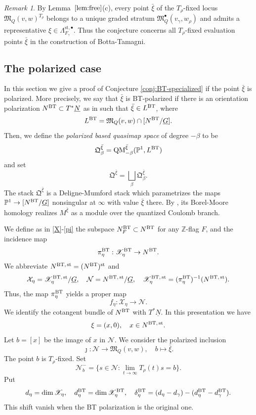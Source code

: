 \documentclass[11pt,reqno]{amsart}
\theoremstyle{definition}
\theoremstyle{remark}
\newtheorem{Remark}[Theorem]{Remark}
\def\dN{\underline N}
\def\dG{\underline G}
\def\dQ{\underline Q}
\def\calN{\mathcal N}
\def\M{\mathfrak M}
\begin{document}
\begin{Remark}
By Lemma~\(\ref{lem:free}\)(c), every point $\bar\xi$
of the \(T_\rho\)-fixed locus \(\M_Q(v,w)^{T_\rho}\) belongs to a unique graded stratum \(\M_{\dQ}^\bullet(v_\gamma,w_\rho)\) and admits a representative
 \(\xi\in\Lambda_{F_\gamma}^{\mathrm{st},\bullet}\). Thus the conjecture concerns all \(T_\rho\)-fixed evaluation points $\bar\xi$ in
 the construction of Botta-Tamagni. 
\end{Remark}



\subsection{The polarized case}
In this section we give a proof of Conjecture \ref{conj:BT-specialized} if the point $\bar\xi$ is polarized.
More precisely, we say that $\bar\xi$ is BT-polarized if there is
an orientation polarization $N^{\rm BT}\subset T^*\dN$ as in \cite[\S1.3.5]{BT26} such that $\bar\xi\in L^{\rm BT}$, where
$$L^{\rm BT}=\M_Q(v,w)\cap[N^{\rm BT}/\dG].$$
Then, we define the \emph{polarized based quasimap space} of degree $-\beta$ to be
\[\mathfrak Q_\beta^{\bar\xi}=\operatorname{QM}_{-\beta}^{\bar\xi}(\mathbb P^1,L^{\rm BT})\]
and set
$$\mathfrak Q^{\bar\xi}=\bigsqcup_\beta\mathfrak Q_\beta^{\bar\xi}.$$
The stack $\mathfrak Q^{\bar\xi}$
 is a Deligne-Mumford stack which parametrizes the maps $\mathbb P^1\to [N^{\rm BT}/\dG]$ nonsingular at $\infty$
with value $\bar\xi$ there.
By \cite[Props.~1.3.8, 2.4.8, 3.2.2]{BT26}, its
Borel-Moore homology realizes $M^{\bar\xi}$ as a module over the quantized Coulomb branch.

We define as in \eqref{X}-\eqref{pi} the subspace $N_F^{\rm BT}\subset N^{\rm BT}$ for any $\mathbb Z$-flag $F$, and the incidence map
$$\pi_\eta^{\rm BT}:\mathscr X_\eta^{\rm BT}\to N^{\rm BT}.$$
We abbreviate $N^{\rm BT,\, st}=(N^{\rm BT})^{\rm st}$ and
$$
\mathcal X_\eta=\mathscr X_\eta^{\rm BT,\, st}/\dG
,\quad
\mathcal N=N^{\rm BT,\, st}/\dG
,\quad
\mathscr X_\eta^{\rm BT,\, st}=(\pi_\eta^{\rm BT})^{-1}(N^{\rm BT,\, st}).$$
Thus, the map $\pi_\eta^{\rm BT}$ yields a proper map 
$$f_\eta:\mathcal X_\eta\to\mathcal N.$$
We identify the cotangent bundle of $N^{\rm BT}$ with $T^*\dN$. 
In this presentation we have 
$$\xi=(x,0),\quad x\in N^{\rm BT,\, st}.$$
Let $b=[x]$ be the image of $x$ in $\mathcal N$.
We consider the polarized inclusion
\[
 \jmath:\mathcal N\longrightarrow \M_Q(v,w),\quad
 b\longmapsto\bar\xi.
\]
The point $b$ is $T_\rho$-fixed.
Set
\[
 \calN_b^-=\{s\in\mathcal N:\lim_{t\to\infty}T_\rho(t)s=b\}.
\]
Put
\[
d_\eta=\dim\mathscr X_\eta
,\quad
 d_\eta^{\rm BT}=\dim\mathscr X_\eta^{\rm BT}
 ,\quad
 \delta_\eta^{\rm BT}
 =(d_\eta-d_\gamma)-(d_\eta^{\rm BT}-d_\gamma^{\rm BT}).
\]
This shift vanish when the BT polarization is the original one. 
\end{document}
